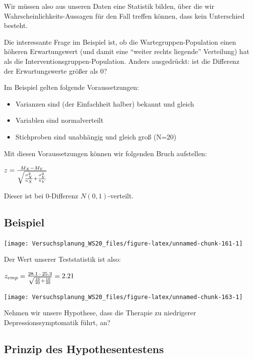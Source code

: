 \documentclass[
]{book}
\providecommand{\tightlist}{%
  \setlength{\itemsep}{0pt}\setlength{\parskip}{0pt}}
\begin{document}
Wir müssen also aus unseren Daten eine Statistik bilden, über die wir Wahrscheinlichkeits-Aussagen für den Fall treffen können, dass kein Unterschied besteht.

Die interessante Frage im Beispiel ist, ob die Wartegruppen-Population einen höheren Erwartungswert (und damit eine ``weiter rechts liegende'' Verteilung) hat als die Interventionsgruppen-Population. Anders ausgedrückt: ist die Differenz der Erwartungswerte größer als 0?

Im Beispiel gelten folgende Voraussetzungen:

\begin{itemize}
\tightlist
\item
  Varianzen sind (der Einfachheit halber) bekannt und gleich
\item
  Variablen sind normalverteilt
\item
  Stichproben sind unabhängig und gleich groß (N=20)
\end{itemize}

Mit diesen Voraussetzungen können wir folgenden Bruch aufstellen: \newline 

\begin{center} $z = {M_X - M_Y\over \sqrt{{\sigma_X^2\over n_X} + {\sigma_Y^2\over n_Y}}}$ \end{center}

Dieser ist bei 0-Differenz \(N(0,1)\)-verteilt.

\hypertarget{beispiel-1}{%
\subsection{Beispiel}\label{beispiel-1}}

\begin{center}\texttt{[image: Versuchsplanung\_WS20\_files/figure-latex/unnamed-chunk-161-1]} \end{center}

Der Wert unserer Teststatistik ist also:

\(z_{emp}={28.1-25.3 \over \sqrt{{ 16 \over 20 } + { 16 \over 20}}} = 2.21\)

\begin{center}\texttt{[image: Versuchsplanung\_WS20\_files/figure-latex/unnamed-chunk-163-1]} \end{center}

Nehmen wir unsere Hypothese, dass die Therapie zu niedrigerer Depressionssymptomatik führt, an?

\hypertarget{prinzip-des-hypothesentestens-1}{%
\subsection{Prinzip des Hypothesentestens}\label{prinzip-des-hypothesentestens-1}}
\end{document}
